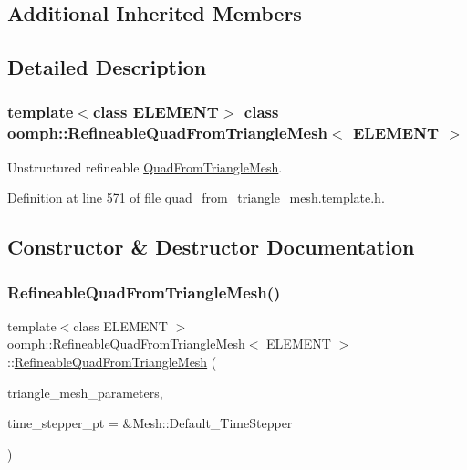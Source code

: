 \subsection*{Additional Inherited Members}


\subsection{Detailed Description}
\subsubsection*{template$<$class E\+L\+E\+M\+E\+NT$>$\newline
class oomph\+::\+Refineable\+Quad\+From\+Triangle\+Mesh$<$ E\+L\+E\+M\+E\+N\+T $>$}

Unstructured refineable \hyperlink{classoomph_1_1QuadFromTriangleMesh}{Quad\+From\+Triangle\+Mesh}. 

Definition at line 571 of file quad\+\_\+from\+\_\+triangle\+\_\+mesh.\+template.\+h.



\subsection{Constructor \& Destructor Documentation}
\mbox{\label{classoomph_1_1RefineableQuadFromTriangleMesh_a76122fefb9de7f79d3f8093f730c3dd4}} 
\subsubsection{\texorpdfstring{Refineable\+Quad\+From\+Triangle\+Mesh()}{RefineableQuadFromTriangleMesh()}\hspace{0.1cm}{\footnotesize\ttfamily [1/2]}}
{\footnotesize\ttfamily template$<$class E\+L\+E\+M\+E\+NT $>$ \\
\hyperlink{classoomph_1_1RefineableQuadFromTriangleMesh}{oomph\+::\+Refineable\+Quad\+From\+Triangle\+Mesh}$<$ E\+L\+E\+M\+E\+NT $>$\+::\hyperlink{classoomph_1_1RefineableQuadFromTriangleMesh}{Refineable\+Quad\+From\+Triangle\+Mesh} (\begin{DoxyParamCaption}\item[{\hyperlink{classoomph_1_1TriangleMeshParameters}{Triangle\+Mesh\+Parameters} \&}]{triangle\+\_\+mesh\+\_\+parameters,  }\item[{Time\+Stepper $\ast$}]{time\+\_\+stepper\+\_\+pt = {\ttfamily \&Mesh\+:\+:Default\+\_\+TimeStepper} }\end{DoxyParamCaption})\hspace{0.3cm}{\ttfamily [inline]}}



